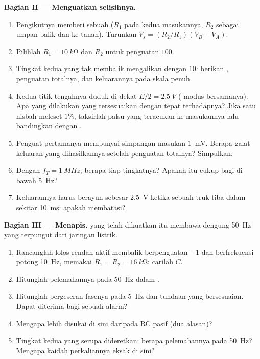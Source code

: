 \begin{problem}
\medskip
\noindent\textbf{Bagian II --- Menguatkan selisihnya.}
\begin{enumerate}[resume]
  \item Pengikutnya memberi sebuah  ($R_1$ pada kedua
        masukannya, $R_2$ sebagai umpan balik dan ke tanah). Turunkan
        $V_s =
        (R_2/R_1)(V_B - V_A)$.
  \item Pilihlah $R_1 = \qty{10}{k\ohm}$ dan $R_2$ untuk penguatan $100$.
  \item Tingkat kedua yang tak membalik mengalikan dengan $10$: berikan
        , penguatan totalnya, dan keluarannya pada skala penuh.
  \item Kedua titik tengahnya duduk di dekat $E/2 = \qty{2.5}{V}$
        ( modus bersamanya). Apa yang dilakukan 
        yang tersesuaikan dengan tepat terhadapnya? Jika satu nisbah
         meleset $1\%$, taksirlah  palsu yang
        teracukan ke masukannya lalu bandingkan dengan .
  \item Penguat pertamanya mempunyai simpangan masukan \qty{1}{mV}.
        Berapa galat keluaran yang dihasilkannya setelah penguatan
        totalnya? Simpulkan.
  \item Dengan $f_T = \qty{1}{MHz}$, berapa  tiap tingkatnya?
        Apakah itu cukup bagi  di bawah \qty{5}{Hz}?
  \item Keluarannya harus berayun sebesar \qty{2.5}{V} ketika sebuah
        truk tiba dalam sekitar \qty{10}{ms}: apakah  membatasi?
\end{enumerate}

\medskip
\noindent\textbf{Bagian III --- Menapis.}
 yang telah dikuatkan itu membawa dengung \qty{50}{Hz} yang
terpungut dari jaringan listrik.
\begin{enumerate}[resume]
  \item Rancanglah lolos rendah aktif membalik berpenguatan $-1$ dan
        berfrekuensi potong \qty{10}{Hz}, memakai
        $R_1 = R_2 = \qty{16}{k\ohm}$: carilah $C$.
  \item Hitunglah pelemahannya pada \qty{50}{Hz} dalam .
  \item Hitunglah pergeseran fasenya pada \qty{5}{Hz} dan tundaan yang
        bersesuaian. Dapat diterima bagi sebuah alarm?
  \item Mengapa  lebih disukai di sini daripada RC pasif
        (dua alasan)?
  \item Tingkat kedua yang serupa dideretkan: berapa pelemahannya pada
        \qty{50}{Hz}? Mengapa kaidah perkaliannya eksak di sini?
\end{enumerate}


\end{problem}
